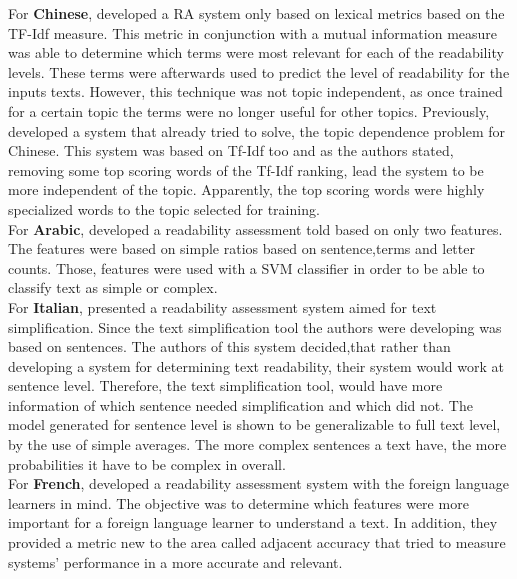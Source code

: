 \documentclass[12pt]{article}
\begin{document}
For \textbf{Chinese}, \cite{chen2011chinese} developed a RA system only based on lexical metrics based on the TF-Idf measure. This metric in conjunction with a mutual information measure was able to determine which terms were most relevant for each of the readability levels. These terms were afterwards used to predict the level of readability for the inputs texts. However, this technique was not topic independent, as once trained for a certain topic the terms were no longer useful for other topics. Previously, \cite{collins2004language} developed a system that already tried to solve, the topic dependence problem for Chinese. This system was based on Tf-Idf too and as the authors stated, removing some top scoring words of the Tf-Idf ranking, lead the system to be more independent of the topic. Apparently, the top scoring words were highly specialized words to the topic selected for training.\\

For \textbf{Arabic}, \cite{al2008towards} developed a readability assessment told based on only two features. The features were based on simple ratios based on sentence,terms and letter counts. Those, features were used with a SVM classifier in order to be able to classify text as simple or complex.\\

For \textbf{Italian}, \cite{dell2011read} presented a readability assessment system aimed for text simplification. Since the text simplification tool the authors were developing was based on sentences. The authors of this system decided,that rather than developing a system for determining text readability, their system would work at sentence level. Therefore, the text simplification tool, would have more information of which sentence needed simplification and which did not. The model generated for sentence level is shown to be generalizable to full text level, by the use of simple averages. The more complex sentences a text have, the more probabilities it have to be complex in overall.\\

For \textbf{French},\cite{franccois2012ai} developed a readability assessment system with the foreign language learners in mind. The objective was to determine which features were more important for a foreign language learner to understand a text. In addition, they provided a metric new to the area called adjacent accuracy that tried to measure systems' performance in a more accurate and relevant. \\
\end{document}
